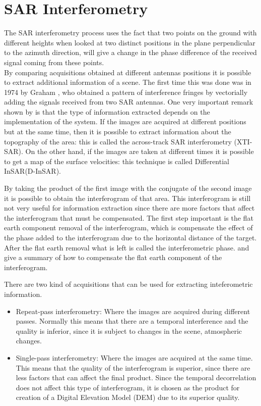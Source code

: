 \section{SAR Interferometry}
\label{sec:sar_interferometry}
The SAR interferometry process uses the fact that two points on the ground with different heights when looked at two distinct positions in the plane perpendicular to the azimuth direction, will give a change in the phase difference of the received signal coming from these points.\\
By comparing acquisitions obtained at different antennas positions it is possible to extract additional information of a scene. The first time this was done was in 1974 by Graham \cite{Graham}, who obtained a pattern of interference fringes by vectorially adding the signals received from two SAR antennas.
One very important remark shown by \cite{Graham} is that the type of information extracted depends on the implementation of the system. If the images are acquired at different positions but at the same time, then it is possible to extract information about the topography of the area: this is called the across-track SAR interferometry (XTI-SAR). On the other hand, if the images are taken at different times it is possible to get a map of the surface velocities: this technique is called Differential InSAR(D-InSAR).


By taking the product of the first image with the conjugate of the second image it is possible to obtain the interferogram of that area. This interferogram is still not very useful for information extraction since there are more factors that affect the interferogram that must be compensated.
The first step important is the flat earth component removal of the interferogram, which is compensate the effect of the phase added to the interferogram due to the horizontal distance of the target. After the flat earth removal what is left is called the interferometric phase. \cite{Rosen} and \cite{Bamler} give a summary of how to compensate the flat earth component of the interferogram.


There are two kind of acquisitions that can be used for extracting inteferometric information.
\begin{itemize}
    \item 
    Repeat-pass interferometry: Where the images are acquired during different passes. Normally this means that there are a temporal interference and the quality is inferior, since it is subject to changes in the scene, atmospheric changes.
    \item
    Single-pass interferometry: Where the images are acquired at the same time. This means that the quality of the interferogram is superior, since there are less factors that can affect the final product. Since the temporal decorrelation does not affect this type of interferogram, it is chosen as the product for creation of a Digital Elevation Model (DEM) due to its superior quality.
\end{itemize}

